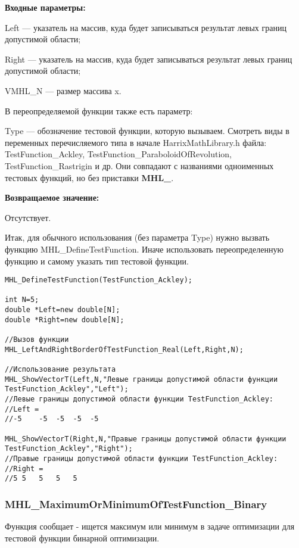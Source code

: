 \documentclass[a4paper,12pt]{article}
\begin{document}
\textbf{Входные параметры:}

Left --- указатель на массив, куда будет записываться результат левых границ допустимой области;

Right --- указатель на массив, куда будет записываться результат левых границ допустимой области;
	 
VMHL\_N --- размер массива x.

В переопределяемой функции также есть параметр:
  
Type --- обозначение тестовой функции, которую вызываем.
Смотреть виды в переменных перечисляемого типа в начале HarrixMathLibrary.h файла: TestFunction\_Ackley, TestFunction\_ParaboloidOfRevolution, TestFunction\_Rastrigin и др. Они совпадают с названиями одноименных тестовых функций, но без приставки \textbf{MHL\_}.

\textbf{Возвращаемое значение:}
 
Отсутствует.

Итак, для обычного использования (без параметра Type) нужно вызвать функцию MHL\_DefineTestFunction. Иначе использовать переопределенную функцию и самому указать тип тестовой функции.


\begin{lstlisting}[label=code_use_MHL_LeftBorderOfTestFunction_Real,caption=Пример использования]
MHL_DefineTestFunction(TestFunction_Ackley);

int N=5;
double *Left=new double[N];
double *Right=new double[N];

//Вызов функции
MHL_LeftAndRightBorderOfTestFunction_Real(Left,Right,N);

//Использование результата
MHL_ShowVectorT(Left,N,"Левые границы допустимой области функции TestFunction_Ackley","Left");
//Левые границы допустимой области функции TestFunction_Ackley:
//Left =	
//-5	-5	-5	-5	-5

MHL_ShowVectorT(Right,N,"Правые границы допустимой области функции TestFunction_Ackley","Right");
//Правые границы допустимой области функции TestFunction_Ackley:
//Right =	
//5	5	5	5	5
\end{lstlisting}

\subsubsection{MHL\_MaximumOrMinimumOfTestFunction\_Binary}\label{MHL_MaximumOrMinimumOfTestFunction_Binary}

	Функция сообщает - ищется максимум или минимум в задаче оптимизации для тестовой функции бинарной оптимизации.
\end{document}
